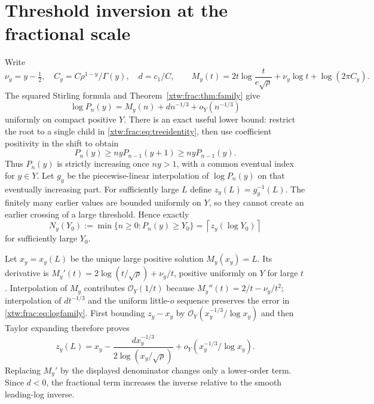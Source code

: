 \documentclass[11pt]{article}
\theoremstyle{remark}\newtheorem{remark}[theorem]{Remark}
\newcommand{\OO}{\mathcal O}
\newcommand{\ceil}[1]{\left\lceil #1\right\rceil}
\begin{document}
\section{Threshold inversion at the fractional scale}\label{xtw:frac:sec:inverse}
Write
\[
 \nu_y=y-\tfrac12,\quad C_y=C\rho^{1-y}/\Gamma(y),\quad d=c_1/C,
 \qquad
 M_y(t)=2t\log\frac{t}{e\sqrt\rho}+\nu_y\log t+\log(2\pi C_y).
\]
The squared Stirling formula and Theorem~\ref{xtw:frac:thm:family} give
\begin{equation}\label{xtw:frac:eq:logfamily}
 \log P_n(y)=M_y(n)+d n^{-1/3}+o_Y(n^{-1/3})
\end{equation}
uniformly on compact positive $Y$. There is an exact useful lower bound:
restrict the root to a single child in \eqref{xtw:frac:eq:treeidentity}, then use
coefficient positivity in the shift to obtain
\begin{equation}\label{xtw:frac:eq:monotone}
 P_n(y)\ge nyP_{n-1}(y+1)\ge nyP_{n-1}(y).
\end{equation}
Thus $P_n(y)$ is strictly increasing once $ny>1$, with a common eventual
index for $y\in Y$.
Let $g_y$ be the piecewise-linear interpolation of $\log P_n(y)$ on that
eventually increasing part. For sufficiently large $L$ define
$z_y(L)=g_y^{-1}(L)$. The finitely many earlier values are bounded
uniformly on $Y$, so they cannot create an earlier crossing of a large
threshold. Hence exactly
\begin{equation}\label{xtw:frac:eq:exactceiling}
 N_y(Y_0):=\min\{n\ge0:P_n(y)\ge Y_0\}=\ceil{z_y(\log Y_0)}
\end{equation}
for sufficiently large $Y_0$.

Let $x_y=x_y(L)$ be the unique large positive solution $M_y(x_y)=L$.
Its derivative is
$M_y'(t)=2\log(t/\sqrt\rho)+\nu_y/t$, positive uniformly on $Y$ for
large $t$. Interpolation of $M_y$ contributes $\OO_Y(1/t)$ because
$M_y''(t)=2/t-\nu_y/t^2$; interpolation of $dt^{-1/3}$ and the uniform
little-$o$ sequence preserves the error in \eqref{xtw:frac:eq:logfamily}.
First bounding $z_y-x_y$ by $\OO_Y(x_y^{-1/3}/\log x_y)$ and then
Taylor expanding therefore proves
\begin{equation}\label{xtw:frac:eq:exactinverse}
 z_y(L)=x_y-\frac{d x_y^{-1/3}}{2\log(x_y/\sqrt\rho)}
                    +o_Y(x_y^{-1/3}/\log x_y).
\end{equation}
Replacing $M_y'$ by the displayed denominator changes only a lower-order
term. Since $d<0$, the fractional term increases the inverse relative to
the smooth leading-log inverse.
\end{document}
